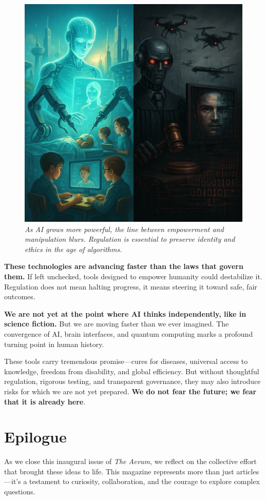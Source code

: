 \documentclass[a4paper,10pt,twocolumn]{memoir}
\begin{document}
{\begin{figure}[h!]
  \centering
  \includegraphics[width=0.6\linewidth]{aivlona.png}
  \caption*{\textit{As AI grows more powerful, the line between empowerment and manipulation blurs. Regulation is essential to preserve identity and ethics in the age of algorithms.}}
\end{figure}

\textbf{These technologies are advancing faster than the laws that govern them.} If left unchecked, tools designed to empower humanity could destabilize it. Regulation does not mean halting progress, it means steering it toward safe, fair outcomes.

\textbf{We are not yet at the point where AI thinks independently, like in science fiction.} But we are moving faster than we ever imagined. The convergence of AI, brain interfaces, and quantum computing marks a profound turning point in human history.

These tools carry tremendous promise—cures for diseases, universal access to knowledge, freedom from disability, and global efficiency. But without thoughtful regulation, rigorous testing, and transparent governance, they may also introduce risks for which we are not yet prepared. \textbf{We do not fear the future; we fear that it is already here}.
\clearpage


\clearpage
\onecolumn
\section*{Epilogue}
\vspace*{0.2cm}
As we close this inaugural issue of \textit{The Aevum}, we reflect on the collective effort that brought these ideas to life. This magazine represents more than just articles—it's a testament to curiosity, collaboration, and the courage to explore complex questions.

}
\end{document}
